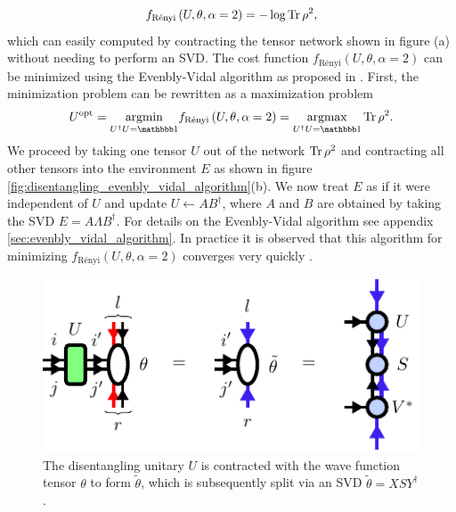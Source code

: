 \begin{equation}
	\label{eq:renyi_entropy_alpha_2}
	f_\text{Rényi}\left(U,\theta,\alpha=2\right) = -\log\operatorname{Tr}\rho^2,
\end{equation}
which can easily computed by contracting the tensor network shown in figure (a) without needing to perform an SVD. The cost function $f_\text{Rényi}\left(U,\theta,\alpha=2\right)$ can be minimized using the Evenbly-Vidal algorithm as proposed in \cite{cite:finding_purifications_with_minimal_entanglement}. First, the minimization problem can be rewritten as a maximization problem
\begin{equation}
	U^\text{opt} = \underset{U^\dagger U = \id}{\argmin} f_\text{Rényi}\left(U,\theta,\alpha=2\right) = \underset{U^\dagger U = \id}{\argmax}\Tr\rho^2.
\end{equation}
We proceed by taking one tensor $U$ out of the network $\operatorname{Tr}\rho^2$ and contracting all other tensors into the environment $E$ as shown in figure \ref{fig:disentangling_evenbly_vidal_algorithm}(b). We now treat $E$ as if it were independent of $U$ and update $U\leftarrow AB^\dagger$, where $A$ and $B$ are obtained by taking the SVD $E=A\Lambda B^\dagger$. For details on the Evenbly-Vidal algorithm see appendix \ref{sec:evenbly_vidal_algorithm}. In practice it is observed that this algorithm for minimizing $f_\text{Rényi}\left(U,\theta,\alpha=2\right)$ converges very quickly \cite{cite:efficient_simulation_of_dynamics_in_two_dimensional_quantum_spin_systems}.\par
\begin{figure}
	\centering
	\includegraphics[scale=1]{figures/tikz/disoTPS/theta_tilde_contraction/theta_tilde_contraction.pdf}
	\caption{The disentangling unitary $U$ is contracted with the wave function tensor $\theta$ to form $\tilde{\theta}$, which is subsequently split via an SVD $\tilde{\theta} = XSY^\dagger$.}
	\label{fig:disentangling_theta_definition}
\end{figure}
